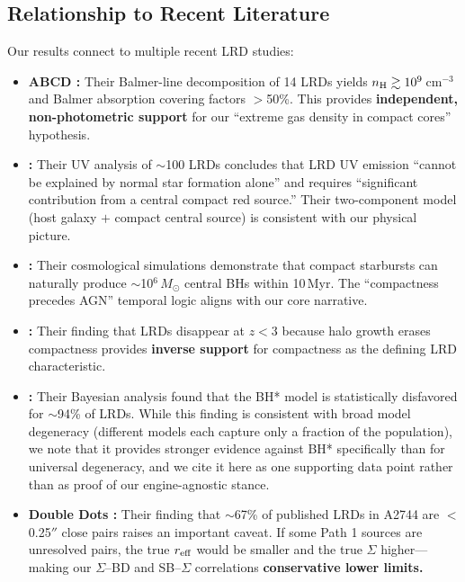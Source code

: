 \documentclass[twocolumn,linenumbers]{aastex631}
\begin{document}
\subsection{Relationship to Recent Literature}

Our results connect to multiple recent LRD studies:

\begin{itemize}
\item \textbf{ABCD \citep{Chen2026ABCD}:} Their Balmer-line decomposition of 14 LRDs yields $n_{\rm H} \gtrsim 10^9$\,cm$^{-3}$ and Balmer absorption covering factors $>$50\%. This provides \textbf{independent, non-photometric support} for our ``extreme gas density in compact cores'' hypothesis.

\item \textbf{\citet{Ando2026}:} Their UV analysis of $\sim$100 LRDs concludes that LRD UV emission ``cannot be explained by normal star formation alone'' and requires ``significant contribution from a central compact red source.'' Their two-component model (host galaxy $+$ compact central source) is consistent with our physical picture.

\item \textbf{\citet{Liempi2026}:} Their cosmological simulations demonstrate that compact starbursts can naturally produce $\sim$10$^6\,M_\odot$ central BHs within 10\,Myr. The ``compactness precedes AGN'' temporal logic aligns with our core narrative.

\item \textbf{\citet{Zhang2026LRD}:} Their finding that LRDs disappear at $z < 3$ because halo growth erases compactness provides \textbf{inverse support} for compactness as the defining LRD characteristic.

\item \textbf{\citet{Merida2026}:} Their Bayesian analysis found that the BH* model is statistically disfavored for $\sim$94\% of LRDs. While this finding is consistent with broad model degeneracy (different models each capture only a fraction of the population), we note that it provides stronger evidence against BH* specifically than for universal degeneracy, and we cite it here as one supporting data point rather than as proof of our engine-agnostic stance.

\item \textbf{Double Dots \citep{Barger2026}:} Their finding that $\sim$67\% of published LRDs in A2744 are $<$0.25$''$ close pairs raises an important caveat. If some Path 1 sources are unresolved pairs, the true $r_{\rm eff}$ would be smaller and the true $\Sigma$ higher---making our $\Sigma$--BD and SB--$\Sigma$ correlations \textbf{conservative lower limits.}


\end{itemize}
\end{document}
